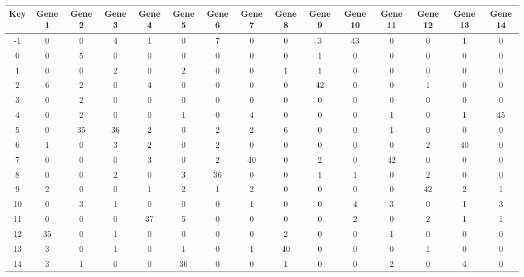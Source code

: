 \begin{tabular}{|c|c|c|c|c|c|c|c|c|c|c|c|c|c|c|}
\hline
Key & Gene 1 & Gene 2 & Gene 3 & Gene 4 & Gene 5 & Gene 6 & Gene 7 & Gene 8 & Gene 9 & Gene 10 & Gene 11 & Gene 12 & Gene 13 & Gene 14 \\
\hline
-1 & 0 & 0 & 4 & 1 & 0 & 7 & 0 & 0 & 3 & 43 & 0 & 0 & 1 & 0 \\
0 & 0 & 5 & 0 & 0 & 0 & 0 & 0 & 0 & 1 & 0 & 0 & 0 & 0 & 0 \\
1 & 0 & 0 & 2 & 0 & 2 & 0 & 0 & 1 & 1 & 0 & 0 & 0 & 0 & 0 \\
2 & 6 & 2 & 0 & 4 & 0 & 0 & 0 & 0 & 42 & 0 & 0 & 1 & 0 & 0 \\
3 & 0 & 2 & 0 & 0 & 0 & 0 & 0 & 0 & 0 & 0 & 0 & 0 & 0 & 0 \\
4 & 0 & 2 & 0 & 0 & 1 & 0 & 4 & 0 & 0 & 0 & 1 & 0 & 1 & 45 \\
5 & 0 & 35 & 36 & 2 & 0 & 2 & 2 & 6 & 0 & 0 & 1 & 0 & 0 & 0 \\
6 & 1 & 0 & 3 & 2 & 0 & 2 & 0 & 0 & 0 & 0 & 0 & 2 & 40 & 0 \\
7 & 0 & 0 & 0 & 3 & 0 & 2 & 40 & 0 & 2 & 0 & 42 & 0 & 0 & 0 \\
8 & 0 & 0 & 2 & 0 & 3 & 36 & 0 & 0 & 1 & 1 & 0 & 2 & 0 & 0 \\
9 & 2 & 0 & 0 & 1 & 2 & 1 & 2 & 0 & 0 & 0 & 0 & 42 & 2 & 1 \\
10 & 0 & 3 & 1 & 0 & 0 & 0 & 1 & 0 & 0 & 4 & 3 & 0 & 1 & 3 \\
11 & 0 & 0 & 0 & 37 & 5 & 0 & 0 & 0 & 0 & 2 & 0 & 2 & 1 & 1 \\
12 & 35 & 0 & 1 & 0 & 0 & 0 & 0 & 2 & 0 & 0 & 1 & 0 & 0 & 0 \\
13 & 3 & 0 & 1 & 0 & 1 & 0 & 1 & 40 & 0 & 0 & 0 & 1 & 0 & 0 \\
14 & 3 & 1 & 0 & 0 & 36 & 0 & 0 & 1 & 0 & 0 & 2 & 0 & 4 & 0 \\
\hline
\end{tabular}